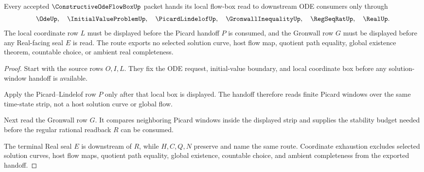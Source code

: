 \begin{theorem}
\label{thm:constructive-ode-flow-box-picard-local-handoff}
Every accepted $\ConstructiveOdeFlowBoxUp$ packet hands its local flow-box read to downstream ODE consumers only through
$$
\OdeUp,\quad
\InitialValueProblemUp,\quad
\PicardLindelofUp,\quad
\GronwallInequalityUp,\quad
\RegSeqRatUp,\quad
\RealUp .
$$
The local coordinate row $L$ must be displayed before the Picard handoff $P$ is consumed, and the Gronwall row $G$ must be displayed before any Real-facing seal $E$ is read. The route exports no selected solution curve, host flow map, quotient path equality, global existence theorem, countable choice, or ambient real completeness.
\end{theorem}
\begin{proof}
Start with the source rows $O,I,L$. They fix the ODE request, initial-value boundary, and local coordinate box before any solution-window handoff is available.

Apply the Picard--Lindelof row $P$ only after that local box is displayed. The handoff therefore reads finite Picard windows over the same time-state strip, not a host solution curve or global flow.

Next read the Gronwall row $G$. It compares neighboring Picard windows inside the displayed strip and supplies the stability budget needed before the regular rational readback $R$ can be consumed.

The terminal Real seal $E$ is downstream of $R$, while $H,C,Q,N$ preserve and name the same route. Coordinate exhaustion excludes selected solution curves, host flow maps, quotient path equality, global existence, countable choice, and ambient completeness from the exported handoff.
\end{proof}


\begin{closurestatus}{\ConstructiveOdeFlowBoxUp}
  \theoryclosure{\seedClosure}
  \formalstatus{\unformalizedV}
\end{closurestatus}
